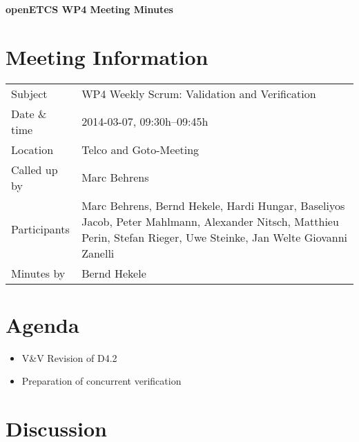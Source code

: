 \documentclass[a4paper, 11pt]{article}
\begin{document}
{\begin{center}\huge\bf openETCS WP4 Meeting Minutes\end{center}}
\section{Meeting Information}

\renewcommand{\arraystretch}{1.5}
\begin{supertabular}{m{.2\textwidth}m{.8\textwidth}}
Subject & WP4 Weekly Scrum: Validation and Verification\\
Date \& time & 2014-03-07, 09:30h--09:45h\\
Location & Telco and Goto-Meeting\\
Called up by & Marc Behrens\\
Participants &
Marc Behrens,
Bernd Hekele,
Hardi Hungar,
Baseliyos Jacob,
Peter Mahlmann,
Alexander Nitsch,
Matthieu Perin,
Stefan Rieger,
Uwe Steinke,
Jan Welte
Giovanni Zanelli
\\

Minutes by & Bernd Hekele\\

\end{supertabular}
\renewcommand{\arraystretch}{1.0}


\section{{Agenda}}
\begin{itemize}
\item V\&V Revision of D4.2
\item Preparation of concurrent verification
\end{itemize}

\section{Discussion}
\end{document}
